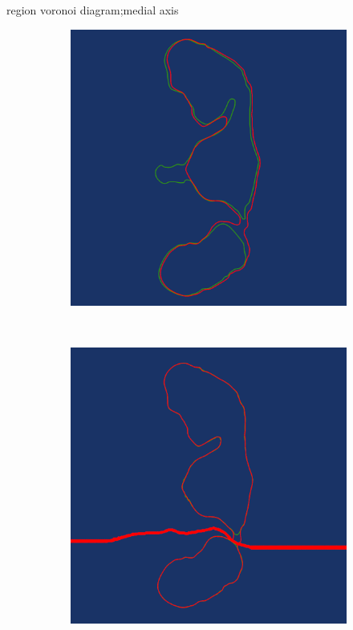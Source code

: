 \documentclass[3p,times]{elsarticle}
\begin{document}
region voronoi diagram;medial axis

\begin{figure}[ht]
\centering
\begin{subfigure}[b]{0.25\textwidth}
\includegraphics[width=\textwidth]{../picture/Medial_original_20_21.png}
\caption{}
\label{fig:Medial_original_20_21}
\end{subfigure}
~~~~~~~~~~~~~~~~~~~~~~~~~~~~~~~~~~~~
\begin{subfigure}[b]{0.25\textwidth}
\includegraphics[width=\textwidth]{../picture/Medial_transformed_20_21.png}
\caption{}
\label{fig:Medial_transformed_20_21}
\end{subfigure}


\end{figure}
\end{document}
